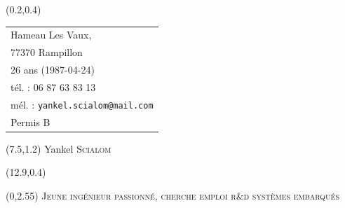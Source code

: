 \documentclass[10pt]{article}
\newcommand{\emphcolor}{NavyBlue}
\newcommand{\cemph}[1]{{\color{\emphcolor} #1}}
\begin{document}
\thispagestyle{empty}

\begin{textblock}{7}(0.2,0.4)
	\begin{tabular}{l}
		\small
		Hameau Les Vaux,\\ 77370 Rampillon\\
		26 ans (1987-04-24)\\
		tél. : 06 87 63 83 13\\
		mél. : \texttt{yankel.scialom@mail.com}\\
		Permis B
	\end{tabular}
\end{textblock}

\begin{textblock}{7}(7.5,1.2)
	{\Huge Yankel \textsc{Scialom}}
	
	\vspace{1em}
\end{textblock}

\begin{textblock}{7}(12.9,0.4)
	{\color{\emphcolor}}
\end{textblock}


\begin{textblock}{16}(0,2.55)
	\centering
	\fontsize{15pt}{18pt}\selectfont
	\cemph{\textsc{Jeune ingénieur passionné, cherche emploi r\&d systèmes embarqués}}
\end{textblock}
\end{document}
